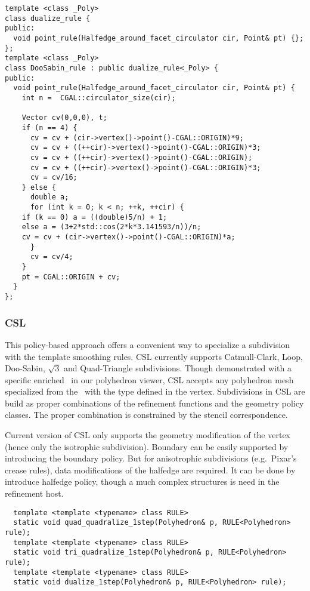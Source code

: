 \begin{lstlisting}
template <class _Poly>
class dualize_rule {
public:
  void point_rule(Halfedge_around_facet_circulator cir, Point& pt) {};
};
template <class _Poly>
class DooSabin_rule : public dualize_rule<_Poly> {
public:
  void point_rule(Halfedge_around_facet_circulator cir, Point& pt) {
    int n =  CGAL::circulator_size(cir); 

    Vector cv(0,0,0), t;
    if (n == 4) {
      cv = cv + (cir->vertex()->point()-CGAL::ORIGIN)*9;
      cv = cv + ((++cir)->vertex()->point()-CGAL::ORIGIN)*3;
      cv = cv + ((++cir)->vertex()->point()-CGAL::ORIGIN);
      cv = cv + ((++cir)->vertex()->point()-CGAL::ORIGIN)*3;
      cv = cv/16;
    } else {
      double a;
      for (int k = 0; k < n; ++k, ++cir) {
	if (k == 0) a = ((double)5/n) + 1;
	else a = (3+2*std::cos(2*k*3.141593/n))/n;
	cv = cv + (cir->vertex()->point()-CGAL::ORIGIN)*a;
      }
      cv = cv/4;
    }
    pt = CGAL::ORIGIN + cv;
  }
};
\end{lstlisting}




\subsubsection{CSL}
This policy-based approach offers a convenient way to
specialize a subdivision with the template smoothing rules.
CSL currently supports Catmull-Clark, 
Loop, Doo-Sabin, $\sqrt{3}$ and Quad-Triangle
subdivisions. %
Though demonstrated with a specific enriched \poly\ in our 
polyhedron viewer, CSL accepts any polyhedron mesh specialized 
from the \poly\ with the  type defined in the vertex.  
Subdivisions in CSL are build as proper combinations of the
refinement functions and the geometry policy classes.
The proper combination is constrained by the stencil correspondence.

Current version of CSL only supports the geometry modification 
of the vertex (hence only the isotrophic subdivision). Boundary
can be easily supported by introducing the boundary policy. But
for anisotrophic subdivisions (e.g.\ Pixar's crease rules), data
modifications of the halfedge are required. It can be done by 
introduce halfedge policy, though a much complex structures
is need in the refinement host.


\begin{lstlisting}
  template <template <typename> class RULE>
  static void quad_quadralize_1step(Polyhedron& p, RULE<Polyhedron> rule);
  template <template <typename> class RULE>
  static void tri_quadralize_1step(Polyhedron& p, RULE<Polyhedron> rule);
  template <template <typename> class RULE>
  static void dualize_1step(Polyhedron& p, RULE<Polyhedron> rule);
\end{lstlisting}


